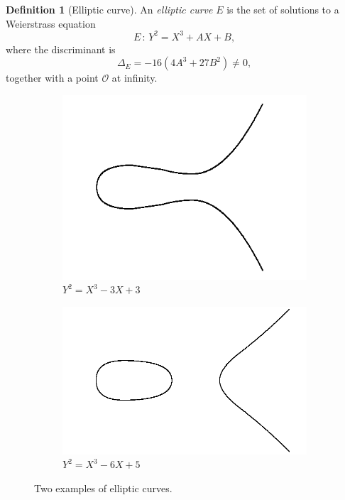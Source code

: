 \documentclass[9pt]{article}
\theoremstyle{definition}
\newtheorem{definition}{Definition}[section]
\begin{document}
\begin{definition}[Elliptic curve]
An \textit{elliptic curve} $E$ is the set of solutions to a Weierstrass equation
$$E \, : \, Y^2 = X^3 + AX + B,$$
where the discriminant is
$$\Delta_E = -16 \left( 4 A^3 + 27 B^2 \right) \neq 0,$$
together with a point $\mathcal{O}$ at infinity.
\end{definition}

\begin{figure}[h]
	\centering
	\begin{subfigure}[b]{0.35\textwidth}
		\centering
		\includegraphics[width=\textwidth]{exEC1.png}
		\caption{$Y^2 = X^3 - 3X + 3$}
		\label{fig:ec1}
	\end{subfigure}
	\begin{subfigure}[b]{0.35\textwidth}
		\centering
		\includegraphics[width=\textwidth]{exEC2.png}
		\caption{$Y^2 = X^3 - 6X + 5$}
		\label{fig:ec2}
	\end{subfigure}
	\caption{Two examples of elliptic curves.}
	\label{fig:2ec}
\end{figure}
\end{document}
